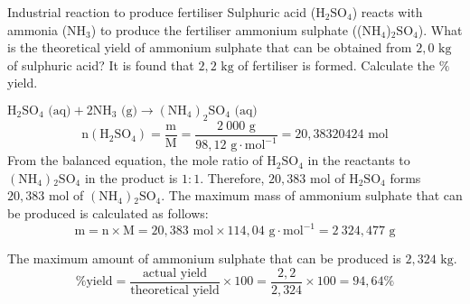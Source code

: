  \label{m38712*secfhsst!!!underscore!!!id2067}
      \noindent 
      \begin{wex}{Industrial reaction to produce fertiliser }
{
\label{m38712*probfhsst!!!underscore!!!id2068}
      \label{m38712*id284606}Sulphuric acid ($\text{H}{}_{2}\text{SO}{}_{4}$) reacts with ammonia ($\text{NH}{}_{3}$) to produce the fertiliser ammonium sulphate (($\text{NH}{}_{4}$)${}_{2}\text{SO}{}_{4}$). What is the theoretical yield of ammonium sulphate that can be obtained from $2,0 \text{ kg}$ of sulphuric acid? It is found that $2,2 \text{ kg}$ of fertiliser is formed. Calculate the $\%$ yield. }
{
      \label{m38712*id284813}\nopagebreak\noindent{}
\label{m38712*id284690}${\text{H}}_{2}{\text{SO}}_{4} \text{ (aq)} + 2{\text{NH}}_{3}\text{ (g)} \to {({\text{NH}}_{4})}_{2}{\text{SO}}_{4}  \text{ (aq)}$
    \begin{equation*}
    \text{n} ({\text{H}}_{2}{\text{SO}}_{4}) = \frac{\text{m}}{\text{M}} = \frac{2~000 \text{ g}}{98,12 \text{ g} \cdot {\text{mol}}^{-1}} = 20,38320424\text{ mol}
      \end{equation*}
      \label{m38712*id285156}From the balanced equation, the mole ratio of $\text{H}{}_{2}\text{SO}{}_{4}$ in the reactants to $(\text{NH}{}_{4}){}_{2}\text{SO}{}_{4}$ in the product is $1:1$. Therefore, $20,383 \text{ mol}$ of $\text{H}{}_{2}\text{SO}{}_{4}$ forms $20,383 \text{ mol}$ of $(\text{NH}{}_{4}){}_{2}\text{SO}{}_{4}$. 
      \label{m38712*id285290}The maximum mass of ammonium sulphate that can be produced is calculated as follows:
      \label{m38712*id285296}\nopagebreak\noindent{}
    \begin{equation*}
    \text{m}=\text{n} \times \text{M} = 20,383 \text{ mol} \times 114,04 \text{ g} \cdot {\text{mol}}^{-1} = 2~324,477 \text{ g}
      \end{equation*}
      
      \label{m38712*id285362}The maximum amount of ammonium sulphate that can be produced is $2,324 \text{ kg}$.
\begin{equation*}
\text{\% yield} = \frac{\text{actual yield}}{\text{theoretical yield}} \times 100 = \frac{2,2}{2,324} \times 100 = 94,64 \%\end{equation*}
}
    \end{wex}
\label{m38717*secfhsst!!!underscore!!!id695}
